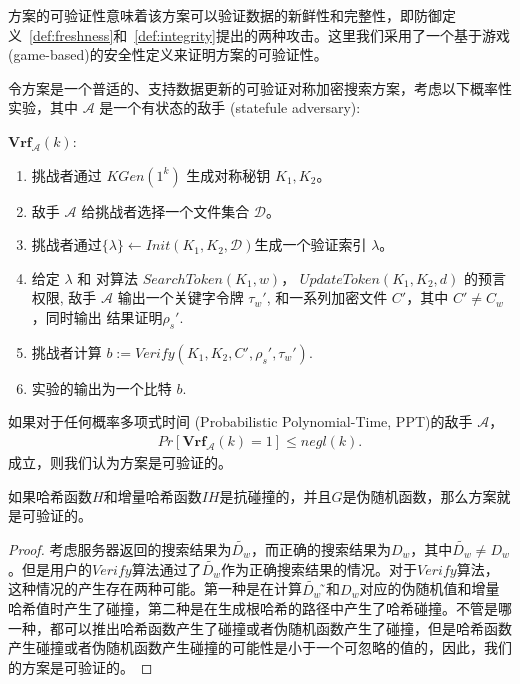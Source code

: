 \single 方案的可验证性意味着该方案可以验证数据的新鲜性和完整性，即防御定义~\ref{def:freshness}和~\ref{def:integrity}提出的两种攻击。这里我们采用了一个基于游戏 (game-based)的安全性定义来证明\single 方案的可验证性。

\begin{definition}
  \itshape{
      令方案\single 是一个普适的、支持数据更新的可验证对称加密搜索方案，考虑以下概率性实验，其中 $\mathcal{A}$ 是一个有状态的敌手 (statefule adversary):

      \noindent$\mathbf{Vrf}_\mathcal{A}(k)$:
      \begin{enumerate}[1.]
        \item 挑战者通过 $KGen(1^k)$ 生成对称秘钥 $K_1,K_2$。
        \item 敌手 $\mathcal{A}$ 给挑战者选择一个文件集合 $\mathcal{D}$。
        \item 挑战者通过$\{\lambda\} \leftarrow Init(K_1,K_2,\mathcal{D})$生成一个验证索引 $\lambda$。
        \item 给定 $\lambda$ 和 对算法 $SearchToken(K_1,w)$， $UpdateToken(K_1,K_2,d)$ 的预言权限, 敌手 $\mathcal{A}$ 输出一个关键字令牌 $\tau_w'$, 和一系列加密文件 $C'$，其中 $C' \neq C_w$，同时输出%
        结果证明$\rho_s'$.
        \item 挑战者计算 $b:=Verify(K_1,K_2,C',\rho_s',\tau_w')$.
        \item 实验的输出为一个比特 $b$.
      \end{enumerate}
      如果对于任何概率多项式时间 (Probabilistic Polynomial-Time, PPT)的敌手 $\mathcal{A}$，
      \begin{align}
        Pr[\mathbf{Vrf}_\mathcal{A}(k)=1] \leq negl(k).
      \end{align}
      成立，则我们认为\single 方案是可验证的。
  }
\end{definition}

\begin{theorem}
    如果哈希函数$H$和增量哈希函数$IH$是抗碰撞的，并且$G$是伪随机函数，那么\single 方案就是可验证的。
\end{theorem}

\begin{proof}
  考虑服务器返回的搜索结果为$\tilde{D_w}$，而正确的搜索结果为$D_w$，其中$\tilde{D_w} \neq D_w$。但是用户的$Verify$算法通过了$\tilde{D_w}$作为正确搜索结果的情况。对于$Verify$算法，这种情况的产生存在两种可能。第一种是在计算$\tilde{D_w}$ ̃和$D_w$对应的伪随机值和增量哈希值时产生了碰撞，第二种是在生成根哈希的路径中产生了哈希碰撞。不管是哪一种，都可以推出哈希函数产生了碰撞或者伪随机函数产生了碰撞，但是哈希函数产生碰撞或者伪随机函数产生碰撞的可能性是小于一个可忽略的值的，因此，我们的方案是可验证的。
\end{proof}


